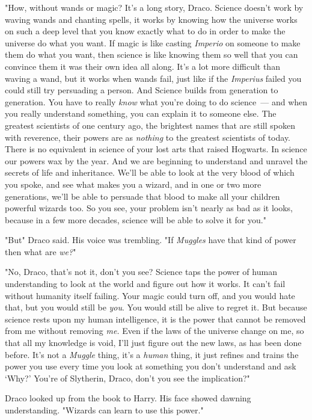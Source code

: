 "How, without wands or magic? It's a long story, Draco. Science doesn't work by
waving wands and chanting spells, it works by knowing how the universe works on
such a deep level that you know exactly what to do in order to make the
universe do what you want. If magic is like casting \emph{Imperio} on someone
to make them do what you want, then science is like knowing them so well that
you can convince them it was their own idea all along. It's a lot more
difficult than waving a wand, but it works when wands fail, just like if the
\emph{Imperius} failed you could still try persuading a person. And Science
builds from generation to generation. You have to really \emph{know} what
you're doing to do science~--- and when you really understand something, you can
explain it to someone else. The greatest scientists of one century ago, the
brightest names that are still spoken with reverence, their powers are as
\emph{nothing} to the greatest scientists of today. There is no equivalent in
science of your lost arts that raised Hogwarts. In science our powers wax by
the year. And we are beginning to understand and unravel the secrets of life
and inheritance. We'll be able to look at the very blood of which you spoke,
and see what makes you a wizard, and in one or two more generations, we'll be
able to persuade that blood to make all your children powerful wizards too. So
you see, your problem isn't nearly as bad as it looks, because in a few more
decades, science will be able to solve it for you."

"But{\el}" Draco said. His voice was trembling. "If \emph{Muggles} have that
kind of power{\el} then{\el} what are \emph{we?}"

"No, Draco, that's not it, don't you see? Science taps the power of human
understanding to look at the world and figure out how it works. It can't fail
without humanity itself failing. Your magic could turn off, and you would hate
that, but you would still be \emph{you}. You would still be alive to regret it.
But because science rests upon my human intelligence, it is the power that
cannot be removed from me without removing \emph{me.} Even if the laws of the
universe change on me, so that all my knowledge is void, I'll just figure out
the new laws, as has been done before. It's not a \emph{Muggle} thing, it's a
\emph{human} thing, it just refines and trains the power you use every time you
look at something you don't understand and ask `Why?' You're of Slytherin,
Draco, don't you see the implication?"

Draco looked up from the book to Harry. His face showed dawning understanding.
"Wizards can learn to use this power."

